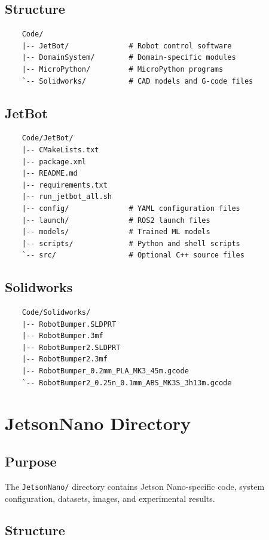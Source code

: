 \subsection{Structure}

\begin{verbatim}
	Code/
	|-- JetBot/              # Robot control software
	|-- DomainSystem/        # Domain-specific modules
	|-- MicroPython/         # MicroPython programs
	`-- Solidworks/          # CAD models and G-code files
\end{verbatim}

\subsection{JetBot}

\begin{verbatim}
	Code/JetBot/
	|-- CMakeLists.txt
	|-- package.xml
	|-- README.md
	|-- requirements.txt
	|-- run_jetbot_all.sh
	|-- config/              # YAML configuration files
	|-- launch/              # ROS2 launch files
	|-- models/              # Trained ML models
	|-- scripts/             # Python and shell scripts
	`-- src/                 # Optional C++ source files
\end{verbatim}

\subsection{Solidworks}

\begin{verbatim}
	Code/Solidworks/
	|-- RobotBumper.SLDPRT
	|-- RobotBumper.3mf
	|-- RobotBumper2.SLDPRT
	|-- RobotBumper2.3mf
	|-- RobotBumper_0.2mm_PLA_MK3_45m.gcode
	`-- RobotBumper2_0.25n_0.1mm_ABS_MK3S_3h13m.gcode
\end{verbatim}

\section{JetsonNano Directory}

\subsection{Purpose}

The \texttt{JetsonNano/} directory contains Jetson Nano-specific code, system configuration, datasets, images, and experimental results.

\subsection{Structure}

